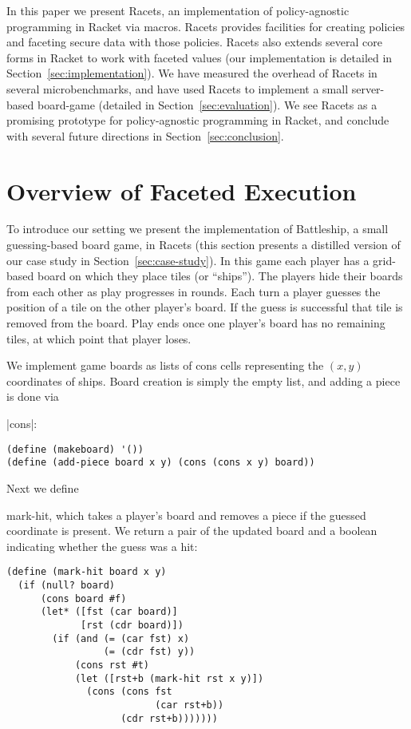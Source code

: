 \documentclass[review=true,acmlarge]{acmart}
\newcommand*{\SavedLstInline}{}
\DeclareRobustCommand*{\lstinline}{%
  \ifmmode
    \let\SavedBGroup\bgroup
    \def\bgroup{%
      \let\bgroup\SavedBGroup
      \hbox\bgroup
    }%
  \fi
  \SavedLstInline
}
\newcommand{\colorMATH}{black!20!blue}
\newcommand{\blue}[1] {{\color{\colorMATH} #1}}
\newcommand{\code}[1]{\lstinline{#1}}
\begin{document}
In this paper we present Racets, an implementation of policy-agnostic
programming in Racket via macros. Racets provides facilities for
creating policies and faceting secure data with those policies. Racets
also extends several core forms in Racket to work with faceted
values (our implementation is detailed in Section~\ref{sec:implementation}). We
have measured the overhead of Racets in several microbenchmarks, and
have used Racets to implement a small server-based
board-game (detailed in Section~\ref{sec:evaluation}). We see Racets as a
promising prototype for policy-agnostic programming in Racket, and
conclude with several future directions in Section~\ref{sec:conclusion}.

\section{Overview of Faceted Execution}

To introduce our setting we present the implementation of Battleship,
a small guessing-based board game, in Racets (this section presents a
distilled version of our case study in
Section~\ref{sec:case-study}). In this game each player has a
grid-based board on which they place tiles (or ``ships''). The players
hide their boards from each other as play progresses in rounds. Each
turn a player guesses the position of a tile on the other player's
board. If the guess is successful that tile is removed from the
board. Play ends once one player's board has no remaining tiles, at
which point that player loses.

We implement game boards as lists of cons cells representing the
\blue{$(x,y)$} coordinates of ships. Board creation is simply the empty
list, and adding a piece is done via \lstinline|cons|:

\begin{lstlisting}[language=Racket,escapechar=|,name=example]
(define (makeboard) '())
(define (add-piece board x y) (cons (cons x y) board))
\end{lstlisting}

Next we define \code{mark-hit}, which takes a player's board and
removes a piece if the guessed coordinate is present. We 
return a pair of the updated board and a boolean indicating
whether the guess was a hit:

\begin{lstlisting}[language=Racket,escapechar=|,name=example]
(define (mark-hit board x y)
  (if (null? board)
      (cons board #f)
      (let* ([fst (car board)]
             [rst (cdr board)])
        (if (and (= (car fst) x)
                 (= (cdr fst) y))
            (cons rst #t)
            (let ([rst+b (mark-hit rst x y)])
              (cons (cons fst
                          (car rst+b))
                    (cdr rst+b)))))))
\end{lstlisting}
\end{document}
